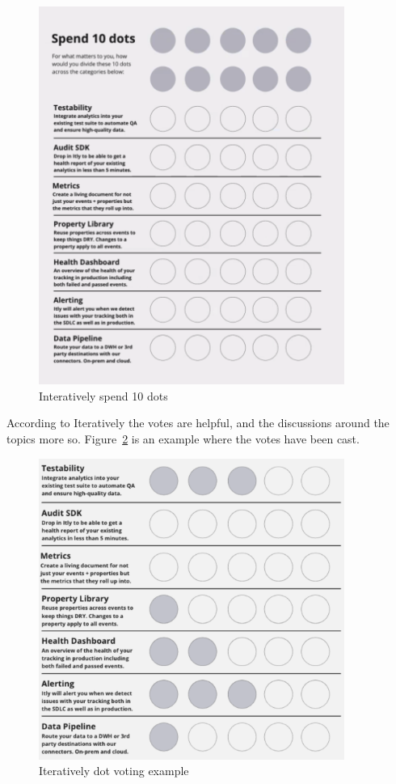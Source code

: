 \begin{figure}
    \centering
    \includegraphics[width=10cm]{images/iteratively/spend-10-dots.png}
    \caption{Interatively spend 10 dots}
    \label{fig:iteratively-spend-10-dots}
\end{figure}

According to Iteratively the votes are helpful, and the discussions around the topics more so.  Figure~\ref{fig:iteratively-dot-voting-example} is an example where the votes have been cast. 

\begin{figure}[ht]
    \centering
    \includegraphics[width=10cm]{images/iteratively/dot-voting-example.png}
    \caption{Iteratively dot voting example}
    \label{fig:iteratively-dot-voting-example}
\end{figure}


